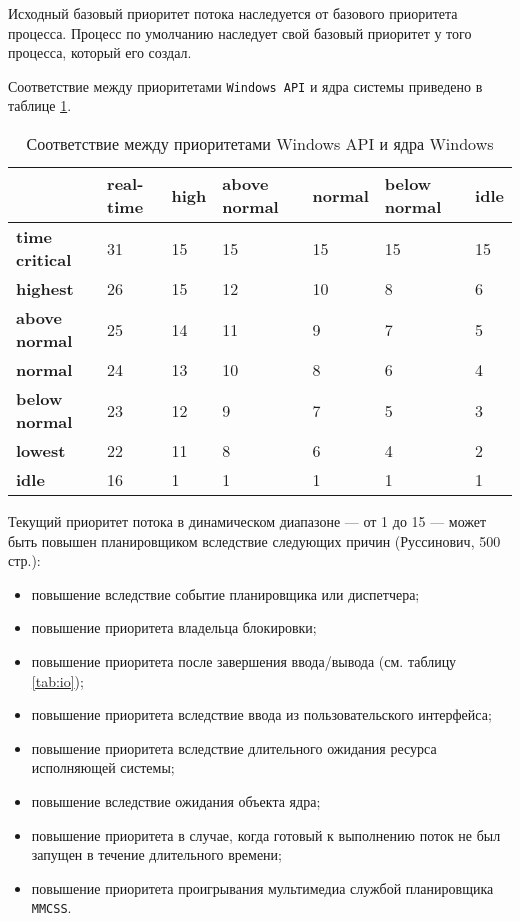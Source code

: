 Исходный базовый приоритет потока наследуется от базового приоритета процесса. Процесс по умолчанию наследует свой базовый приоритет у того процесса, который его создал.

Соответствие между приоритетами \texttt{Windows API} и ядра системы приведено в таблице \ref{tbl:priority}.

\begin{table}[h]
    \caption{Соответствие между приоритетами Windows API и ядра Windows}
    \begin{center}
        \begin{tabular}{|l|p{45pt}|p{45pt}|p{45pt}|p{45pt}|p{45pt}|p{45pt}|}
            \hline
            {} & \textbf{real-time} & \textbf{high} & \textbf{above normal} & \textbf{normal} & \textbf{below normal} & \textbf{idle}\\
            \hline
            \textbf{time critical} & 31 & 15 & 15 & 15 & 15 & 15 \\
            \hline
            \textbf{highest} & 26 & 15 & 12 & 10 & 8 & 6 \\
            \hline
            \textbf{above normal} & 25 & 14 & 11 & 9 & 7 & 5 \\
            \hline
            \textbf{normal} & 24 & 13 & 10 & 8 & 6 & 4 \\
            \hline
            \textbf{below normal} & 23 & 12 & 9 & 7 & 5 & 3 \\
            \hline
            \textbf{lowest} & 22 & 11 & 8 & 6 & 4 & 2 \\
            \hline
            \textbf{idle} & 16 & 1 & 1 & 1 & 1 & 1 \\
            \hline
        \end{tabular}
    \end{center}
    \label{tbl:priority}
\end{table}


Текущий приоритет потока в динамическом диапазоне --- от 1 до 15 --- может быть повышен планировщиком вследствие следующих причин (Руссинович, 500 стр.):

\begin{itemize}
    \item повышение вследствие событие планировщика или диспетчера;
    \item повышение приоритета владельца блокировки;
    \item повышение приоритета после завершения ввода/вывода (см. таблицу \ref{tab:io});
    \item повышение приоритета вследствие ввода из пользовательского интерфейса;
    \item повышение приоритета вследствие длительного ожидания ресурса исполняющей системы;
    \item повышение вследствие ожидания объекта ядра;
    \item повышение приоритета в случае, когда готовый к выполнению поток не был запущен в течение длительного времени;
    \item повышение приоритета проигрывания мультимедиа службой планировщика \texttt{MMCSS}.
\end{itemize}


